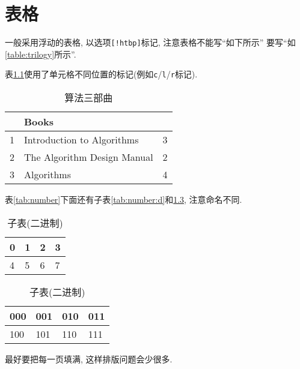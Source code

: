 \chapter{表格}


  一般采用浮动的表格, 以选项\texttt{[!htbp]}标记, 注意表格不能写``如下所示''
要写``如\ref{table:trilogy}所示''.


  表\ref{tab:trilogy}使用了单元格不同位置的标记(例如\texttt{c}/\texttt{l}/\texttt{r}标记).

\begin{table}[!hbtp]
\centering
\begin{tabular}{|c|l|r|}
\hline
    & Books                         &     \\ \hline
1   & Introduction to Algorithms    & 3 \\
2   & The Algorithm Design Manual   & 2 \\
3   & Algorithms                    & 4 \\
\hline
\end{tabular}
\caption{算法三部曲}
\label{tab:trilogy}
\end{table}


  表\ref{tab:number}下面还有子表\ref{tab:number:d}和\ref{tab:number:b}, 注意命名不同.

\begin{table}[!htb]
\centering
  \caption{主表}
  \label{tab:number}
\begin{subtable}[t]{2in}
  \centering
  \begin{tabular}{|l|l|l|l|}
  \hline
  0 & 1 & 2 & 3 \\
  \hline
  4 & 5 & 6 & 7 \\
  \hline
  \end{tabular}
  \caption{子表(十进制)}\label{tab:number:d}
\end{subtable}
\quad
\begin{subtable}[t]{2in}
  \centering
  \begin{tabular}{|l|l|l|l|}
  \hline
  000 & 001 & 010 & 011 \\
  \hline
  100 & 101 & 110 & 111 \\
  \hline
  \end{tabular}
  \caption{子表(二进制)}\label{tab:number:b}
\end{subtable}
\end{table}

最好要把每一页填满, 这样排版问题会少很多.
